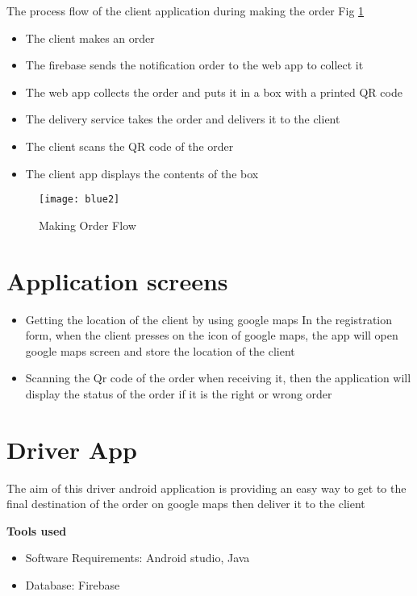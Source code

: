 The process flow of the client application during making the order Fig \ref{fig:blue2}
\begin{itemize}
    \item The client makes an order
    \item The firebase sends the notification order to the web app to collect it
    \item The web app collects the order and puts it in a box with a printed QR code
    \item The delivery service takes the order and delivers it to the client
    \item The client scans the QR code of the order
    \item The client app displays the contents of the box
\end{itemize}

\begin{figure}[h]
    \texttt{[image: blue2]}
    \centering
    \caption{Making Order Flow}
    \label{fig:blue2}
\end{figure}



\section{Application screens}
\begin{itemize}
    \item Getting the location of the client by using google maps
    In the registration form, when the client presses on the icon of google maps, the app will open
    google maps screen and store the location of the client
    \item Scanning the Qr code of the order when receiving it, then the application will display the
    status of the order if it is the right or wrong order
\end{itemize}

\section{Driver App}

The aim of this driver android application is providing an easy way to get to the final destination of
the order on google maps then deliver it to the client\\
\newpage

\textbf{Tools used}
\begin{itemize}
    \item Software Requirements: Android studio, Java
    \item Database: Firebase
\end{itemize}

